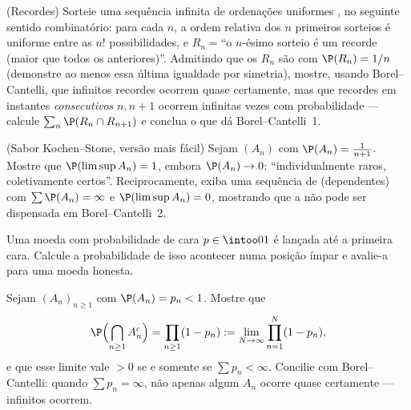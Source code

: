 \begin{exercise}[$\star\star\star$]\label{exo:b2:proba:7}
(Recordes) Sorteie uma sequência infinita de ordenações uniformes
, no seguinte sentido combinatório: para cada $n$, a
ordem relativa dos $n$ primeiros sorteios é uniforme entre as $n!$
possibilidades, e $R_n = {}$``o $n$-ésimo sorteio é um recorde (maior
que todos os anteriores)''. Admitindo que os  $R_n$ são
 com $\P(R_n) = 1/n$ (demonstre ao menos essa última
igualdade por simetria), mostre, usando Borel--Cantelli, que infinitos
recordes ocorrem quase certamente, mas que recordes em instantes
\emph{consecutivos} $n, n+1$ ocorrem infinitas vezes com
probabilidade --- calcule $\sum_n \P(R_n \cap R_{n+1})$ e
conclua o que dá Borel--Cantelli~1.
\end{exercise}

\begin{exercise}[$\star\star\star$]\label{exo:b2:proba:8}
(Sabor Kochen--Stone, versão mais fácil) Sejam $(A_n)$  com $\P(A_n) = \frac{1}{n+1}$. Mostre que
$\P(\limsup A_n) = 1$, embora $\P(A_n) \to 0$: ``individualmente
raros, coletivamente certos''. Reciprocamente, exiba uma sequência de
 (dependentes) com $\sum\P(A_n) = \infty$ e
$\P(\limsup A_n) = 0$, mostrando que a  não pode ser dispensada em
Borel--Cantelli~2.
\end{exercise}

\begin{exercise}[$\star$]\label{exo:b2:proba:9}
Uma moeda com probabilidade de cara $p \in \intoo01$ é lançada até
a primeira cara. Calcule a probabilidade de isso acontecer numa
posição ímpar e avalie-a para uma moeda honesta.
\end{exercise}

\begin{exercise}[$\star\star$]\label{exo:b2:proba:10}
Sejam $(A_n)_{n\geq1}$  com $\P(A_n) =
p_n < 1$. Mostre que
\[
\P\Bigl(\bigcap_{n\geq1}A_n^c\Bigr)
= \prod_{n\geq1}(1 - p_n)
:= \lim_{N\to\infty}\prod_{n=1}^N(1 - p_n),
\]
e que esse limite vale $> 0$ se e somente se $\sum p_n <
\infty$. Concilie com Borel--Cantelli: quando $\sum p_n =
\infty$, não apenas algum $A_n$ ocorre quase certamente ---
infinitos ocorrem.
\end{exercise}

